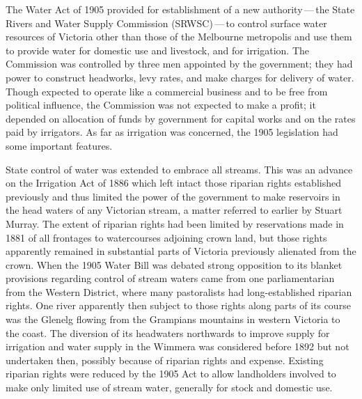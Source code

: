 The Water Act of  1905 provided
for establishment of a new authority\,---\,the State Rivers and Water
Supply Commission (SRWSC)\,---\,to control  surface water resources of Victoria
other than those of the Melbourne metropolis and use them to provide
water for domestic use and livestock, and for irrigation.  The
Commission was controlled by three men appointed by the government;
they had power to construct headworks, levy rates, and make charges
for delivery of water.  Though expected to operate like a commercial
business and to be free from political influence, the Commission was
not expected to make a profit; it depended on allocation of funds by
government for capital works and on the rates paid by irrigators.  As
far as irrigation was concerned, the 1905 legislation had some
important features.

State control of water was extended to embrace all streams.  This was
an advance on the Irrigation Act of 1886
 which left intact those
riparian rights established previously and thus
limited the power of the government to make
reservoirs in the head waters of any
Victorian stream, a matter referred to earlier by Stuart Murray. The
extent of riparian rights had been limited by reservations made in
1881 of all frontages to watercourses adjoining crown land, but those
rights apparently remained in substantial parts of Victoria previously
alienated from the crown.  When the 1905 Water Bill was debated strong
opposition to its blanket provisions regarding control of stream
waters came from one parliamentarian from the Western District, where
many pastoralists had long-established riparian
rights.  One river apparently then subject to
those rights along parts of its course was the Glenelg
 flowing from the Grampians mountains in western
Victoria to the coast.  The diversion of its headwaters northwards to
improve supply for irrigation and water supply in the Wimmera was
considered before 1892 but not undertaken then, possibly because of
riparian rights and expense.  Existing riparian
rights were reduced by the 1905 Act to allow landholders involved to
make only limited use of stream water, generally for stock and
domestic use.


